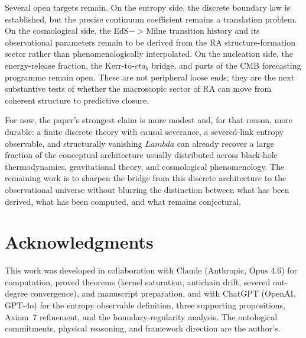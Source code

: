 \documentclass[11pt]{article}
\def\Lambda{Lambda}%
\def\eta{eta}%
\def\to{->}%
\begin{document}
Several open targets remain. On the entropy side, the discrete boundary law is established, but the precise continuum coefficient remains a translation problem. On the cosmological side, the EdS$\to$Milne transition history and its observational parameters remain to be derived from the RA structure-formation sector rather than phenomenologically interpolated. On the nucleation side, the energy-release fraction, the Kerr-to-$\eta_b$ bridge, and parts of the CMB forecasting programme remain open. These are not peripheral loose ends; they are the next substantive tests of whether the macroscopic sector of RA can move from coherent structure to predictive closure.

For now, the paper's strongest claim is more modest and, for that reason, more durable: a finite discrete theory with causal severance, a severed-link entropy observable, and structurally vanishing $\Lambda$ can already recover a large fraction of the conceptual architecture usually distributed across black-hole thermodynamics, gravitational theory, and cosmological phenomenology. The remaining work is to sharpen the bridge from this discrete architecture to the observational universe without blurring the distinction between what has been derived, what has been computed, and what remains conjectural.

\section*{Acknowledgments}

This work was developed in collaboration with Claude (Anthropic, Opus 4.6) for computation, proved theorems (kernel saturation, antichain drift, severed out-degree convergence), and manuscript preparation, and with ChatGPT (OpenAI, GPT-4o) for the entropy observable definition, three supporting propositions, Axiom~7 refinement, and the boundary-regularity analysis. The ontological commitments, physical reasoning, and framework direction are the author's.
\end{document}
